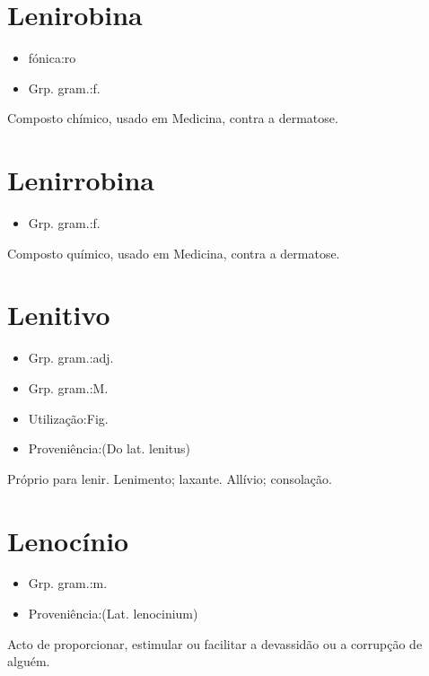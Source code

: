 \section{Lenirobina}
\begin{itemize}
\item {fónica:ro}
\end{itemize}
\begin{itemize}
\item {Grp. gram.:f.}
\end{itemize}
Composto chímico, usado em Medicina, contra a dermatose.
\section{Lenirrobina}
\begin{itemize}
\item {Grp. gram.:f.}
\end{itemize}
Composto químico, usado em Medicina, contra a dermatose.
\section{Lenitivo}
\begin{itemize}
\item {Grp. gram.:adj.}
\end{itemize}
\begin{itemize}
\item {Grp. gram.:M.}
\end{itemize}
\begin{itemize}
\item {Utilização:Fig.}
\end{itemize}
\begin{itemize}
\item {Proveniência:(Do lat. \textunderscore lenitus\textunderscore )}
\end{itemize}
Próprio para lenir.
Lenimento; laxante.
Allívio; consolação.
\section{Lenocínio}
\begin{itemize}
\item {Grp. gram.:m.}
\end{itemize}
\begin{itemize}
\item {Proveniência:(Lat. \textunderscore lenocinium\textunderscore )}
\end{itemize}
Acto de proporcionar, estimular ou facilitar a devassidão ou a corrupção de alguém.
